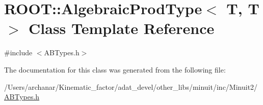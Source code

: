 \hypertarget{classROOT_1_1Minuit2_1_1AlgebraicProdType_3_01T_00_01T_01_4}{}\section{R\+O\+OT\+:\+:Algebraic\+Prod\+Type$<$ T, T $>$ Class Template Reference}
\label{classROOT_1_1Minuit2_1_1AlgebraicProdType_3_01T_00_01T_01_4}


{\ttfamily \#include $<$A\+B\+Types.\+h$>$}



The documentation for this class was generated from the following file\+:\begin{DoxyCompactItemize}
\item 
/\+Users/archanar/\+Kinematic\+\_\+factor/adat\+\_\+devel/other\+\_\+libs/minuit/inc/\+Minuit2/\mbox{\hyperlink{other__libs_2minuit_2inc_2Minuit2_2ABTypes_8h}{A\+B\+Types.\+h}}\end{DoxyCompactItemize}
